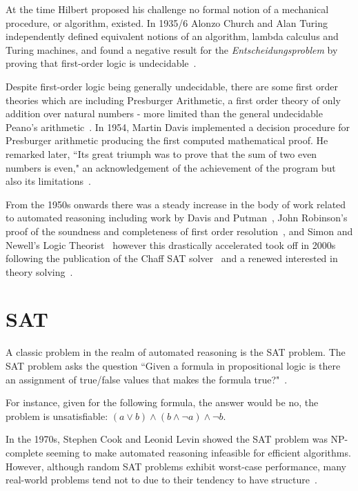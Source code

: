 \documentclass[]{final_report}
\begin{document}
At the time Hilbert proposed his challenge no formal notion of a mechanical procedure, or algorithm, existed. In 1935/6 Alonzo Church and Alan Turing independently defined equivalent notions of an algorithm, lambda calculus and Turing machines, and found a negative result for the \textit{Entscheidungsproblem} by proving that first-order logic is undecidable~\cite{turingchurchproof}.

Despite first-order logic being generally undecidable, there are some first order theories which are including Presburger Arithmetic, a first order theory of only addition over natural numbers - more limited than the general undecidable Peano's arithmetic~\cite{automatedreasoningbooklet2004}. In 1954, Martin Davis implemented a decision procedure for Presburger arithmetic producing the first computed mathematical proof. He remarked later, ``Its great triumph was to prove that the sum of two even numbers is even," an acknowledgement of the achievement of the program but also its limitations~\cite{excapebarrettriseofsmt, automatedreasoningbooklet2004}.

From the 1950s onwards there was a steady increase in the body of work related to automated reasoning including work by Davis and Putman~\cite{Davis:1960:CPQ:321033.321034,Davis:1962:MPT:368273.368557}, John Robinson's proof of the soundness and completeness of first order resolution~\cite{robinson1965machine}, and Simon and Newell's Logic Theorist~\cite{newell1956logic} however this drastically accelerated took off in 2000s following the publication of the Chaff SAT solver~\cite{moskewicz2001chaff} and a renewed interested in theory solving~\cite{excapebarrettriseofsmt}.

\section{SAT}
A classic problem in the realm of automated reasoning is the SAT problem. The SAT problem asks the question ``Given a formula in propositional logic is there an assignment of true/false values that makes the formula true?"~\cite{smtwheredowegofromhere}.

For instance, given for the following formula, the answer would be no, the problem is unsatisfiable: $(a \lor b) \land (b \land \lnot a) \land \lnot b $.

In the 1970s, Stephen Cook and Leonid Levin showed the SAT problem was NP-complete seeming to make automated reasoning infeasible for efficient algorithms. However, although random SAT problems exhibit worst-case performance, many real-world problems tend not to due to their tendency to have structure~\cite{smtwheredowegofromhere}.
\end{document}
